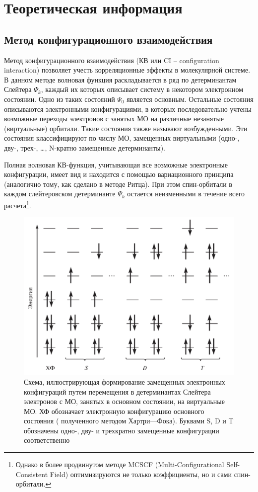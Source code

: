 \section{Теоретическая информация}
\subsection{Метод конфигурационного взаимодействия}
Метод конфигурационного взаимодействия (КВ или CI -- configuration interaction) позволяет учесть корреляционные эффекты в молекулярной системе. В данном методе волновая функция раскладывается в ряд по детерминантам Слейтера $\Psi_k$, каждый их которых описывает систему в некотором электронном состоянии. Одно из таких состояний $\Psi_0$ является основным. Остальные состояния описываются электронными конфигурациями, в которых последовательно учтены возможные переходы электронов с занятых МО на различные незанятые (виртуальные) орбитали. Такие состояния также называют возбужденными. Эти состояния классифицируют по числу МО, замещенных виртуальными (одно-, дву-, трех-, \ldots, N-кратно замещенные детерминанты). 

Полная волновая КВ-функция, учитывающая все возможные электронные конфигурации, имеет вид
и находится с помощью вариационного принципа (аналогично тому, как сделано в методе Ритца). При этом спин-орбитали в каждом слейтеровском детерминанте $\Psi_k$ остается неизменными в течение всего расчета\footnote{Однако в более продвинутом методе MCSCF (Multi-Configurational Self-Consistent Field) оптимизируются не только коэффициенты, но и сами спин-орбитали.}.

\begin{figure}[H]
\centering
\captionsetup{justification=centering}
\includegraphics[scale=0.5]{fig/2.png}
\caption{Схема, иллюстрирующая формирование замещенных электронных конфигураций путем перемещения в детерминантах Слейтера электронов с МО, занятых в основном состоянии, на виртуальные МО. ХФ обозначает электронную конфигурацию основного состояния ( полученного методом Хартри—Фока). Буквами S, D и T обозначены одно-, дву- и трехкратно замещенные конфигурации соответственно}
\end{figure}

